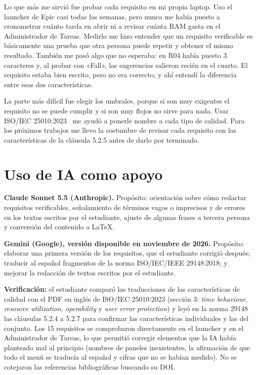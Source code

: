 \documentclass[10pt,a4paper]{article}
\begin{document}
Lo que más me sirvió fue probar cada requisito en mi propia laptop. Uso el launcher de Epic casi todas las semanas, pero nunca me había puesto a cronometrar cuánto tarda en abrir ni a revisar cuánta RAM gasta en el Administrador de Tareas. Medirlo me hizo entender que un requisito verificable es básicamente una prueba que otra persona puede repetir y obtener el mismo resultado. También me pasó algo que no esperaba: en R04 había puesto 3 caracteres y, al probar con «Fall», las sugerencias salieron recién en el cuarto. El requisito estaba bien escrito, pero no era correcto, y ahí entendí la diferencia entre esas dos características.

La parte más difícil fue elegir los umbrales, porque si son muy exigentes el requisito no se puede cumplir y si son muy flojos no sirve para nada. Usar ISO/IEC 25010:2023~\cite{iso25010} me ayudó a ponerle nombre a cada tipo de calidad. Para los próximos trabajos me llevo la costumbre de revisar cada requisito con las características de la cláusula 5.2.5 antes de darlo por terminado.

\section{Uso de IA como apoyo}
\textbf{Claude Sonnet 5.5 (Anthropic).} Prop\'osito: orientaci\'on sobre c\'omo redactar requisitos verificables, se\~nalamiento de t\'erminos vagos o imprecisos y de errores en los textos escritos por el estudiante, ajuste de algunas frases a tercera persona y conversi\'on del contenido a \LaTeX{}.

\textbf{Gemini (Google), versi\'on disponible en noviembre de 2026.} Prop\'osito: elaborar una primera versi\'on de los requisitos, que el estudiante corrigi\'o despu\'es; traducir al espa\~nol fragmentos de la norma ISO/IEC/IEEE 29148:2018; y mejorar la redacci\'on de textos escritos por el estudiante.

\textbf{Verificaci\'on:} el estudiante compar\'o las traducciones de las caracter\'isticas de calidad con el PDF en ingl\'es de ISO/IEC 25010:2023 (secci\'on 3: \emph{time behaviour}, \emph{resource utilization}, \emph{operability} y \emph{user error protection}) y ley\'o en la norma 29148 las cl\'ausulas 5.2.4 a 5.2.7 para confirmar las caracter\'isticas individuales y las del conjunto. Los 15 requisitos se comprobaron directamente en el launcher y en el Administrador de Tareas, lo que permiti\'o corregir elementos que la IA hab\'ia planteado mal al principio (nombres de paneles inexistentes, la afirmaci\'on de que todo el men\'u se traduc\'ia al espa\~nol y cifras que no se hab\'ian medido). No se cotejaron las referencias bibliogr\'aficas buscando su DOI.



\end{document}
